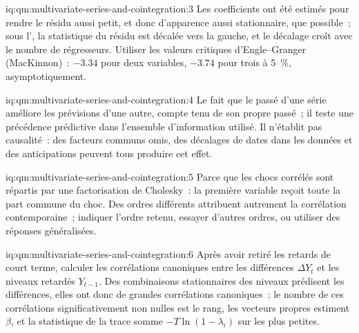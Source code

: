 \begin{solution}{iq:qm:multivariate-series-and-cointegration:3}
Les coefficients ont été estimés pour rendre le résidu aussi petit, et donc d'apparence aussi stationnaire, que possible~; sous l', la statistique du résidu est décalée vers la gauche, et le
décalage croît avec le nombre de régresseurs. Utiliser les valeurs critiques d'Engle--Granger (MacKinnon)~: $-3.34$ pour deux variables, $-3.74$ pour trois à 5~\%, asymptotiquement.
\end{solution}

\begin{solution}{iq:qm:multivariate-series-and-cointegration:4}
Le fait que le passé d'une série améliore les prévisions d'une autre, compte tenu de son propre passé~; il teste une précédence prédictive dans l'ensemble d'information utilisé. Il n'établit pas
causalité~: des facteurs communs omis, des décalages de dates dans les données et des anticipations peuvent tous produire cet effet.
\end{solution}

\begin{solution}{iq:qm:multivariate-series-and-cointegration:5}
Parce que les chocs corrélés sont répartis par une factorisation de Cholesky~: la première variable reçoit toute la part commune du choc. Des ordres différents attribuent autrement la
corrélation contemporaine~; indiquer l'ordre retenu, essayer d'autres ordres, ou utiliser des réponses généralisées.
\end{solution}

\begin{solution}{iq:qm:multivariate-series-and-cointegration:6}
Après avoir retiré les retards de court terme, calculer les corrélations canoniques entre les différences $\Delta Y_t$ et les niveaux retardés $Y_{t-1}$. Des combinaisons
stationnaires des niveaux prédisent les différences, elles ont donc de grandes corrélations canoniques~; le nombre de ces corrélations significativement non nulles est le rang, les
vecteurs propres estiment $\beta$, et la statistique de la trace somme $-T\ln(1 - \lambda_i)$ sur les plus petites.
\end{solution}
